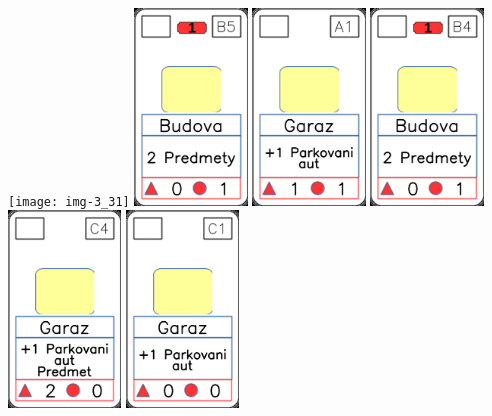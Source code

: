 \documentclass[a4paper]{article}
\begin{document}
	\texttt{[image: img-3\_31]}
	\includegraphics[width=3.0cm]{img-2_9}
	\includegraphics[width=3.0cm]{img-2_15}
	\includegraphics[width=3.0cm]{img-2_8}
	\includegraphics[width=3.0cm]{img-2_13}
	\includegraphics[width=3.0cm]{img-2_10}
\end{document}
